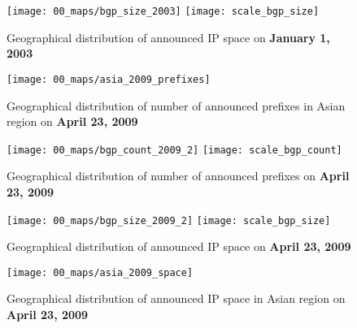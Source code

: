 \begin{figure}[p]
	\centering
		\texttt{[image: 00\_maps/bgp\_size\_2003]}%
		\hspace{-0.98\columnwidth}%
		\texttt{[image: scale\_bgp\_size]}\hspace{-1cm}%
		\hspace{0.98\columnwidth}
	\caption{Geographical distribution of announced IP space on \textbf{January 1, 2003}}
	\label{fig:bgp ip space 2003}
\end{figure}

\begin{figure}[p]
	\centering
		\texttt{[image: 00\_maps/asia\_2009\_prefixes]}%
	\caption{Geographical distribution of number of announced prefixes in Asian region on \textbf{April 23, 2009}}
	\label{fig:bgp prefixes asia 2009}
\end{figure}

\begin{figure}[p]
	\centering
		\texttt{[image: 00\_maps/bgp\_count\_2009\_2]}%
		\hspace{-0.98\columnwidth}%
		\texttt{[image: scale\_bgp\_count]}\hspace{-1cm}%
		\hspace{0.98\columnwidth}
	\caption{Geographical distribution of number of announced prefixes on \textbf{April 23, 2009}}
	\label{fig:bgp prefixes 2009}
\end{figure}

\begin{figure}[p]
	\centering
		\texttt{[image: 00\_maps/bgp\_size\_2009\_2]}%
		\hspace{-0.98\columnwidth}%
		\texttt{[image: scale\_bgp\_size]}\hspace{-1cm}%
		\hspace{0.98\columnwidth}
	\caption{Geographical distribution of announced IP space on \textbf{April 23, 2009}}
	\label{fig:bgp ip space 2009}
\end{figure}


\begin{figure}[p]
	\centering
		\texttt{[image: 00\_maps/asia\_2009\_space]}%
	\caption{Geographical distribution of announced IP space in Asian region on \textbf{April 23, 2009}}
	\label{fig:bgp ip space asia 2009}
\end{figure}

